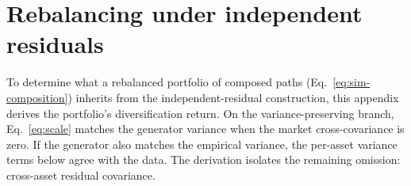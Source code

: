 
\section{Rebalancing under independent residuals}
\label{sec:supp-bias}

To determine what a rebalanced portfolio of composed paths
(Eq.~\eqref{eq:sim-composition}) inherits from the independent-residual
construction, this appendix derives the portfolio's diversification
return. On the variance-preserving branch, Eq.~\eqref{eq:scale} matches the
generator variance when the market cross-covariance is zero. If the
generator also matches the empirical variance, the per-asset variance
terms below agree with the data. The derivation isolates the remaining
omission: cross-asset residual covariance.

